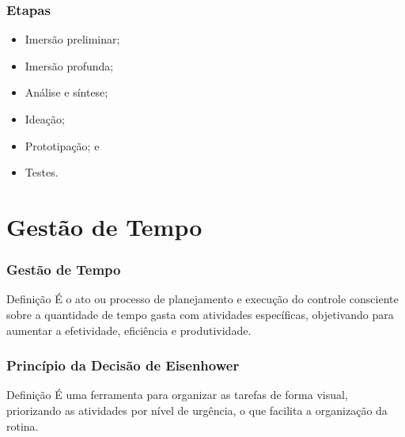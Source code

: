 \documentclass[aspectratio=169]{beamer}
\begin{document}
\begin{frame}
	\frametitle{Etapas}

	\begin{itemize}
		 \item Imersão preliminar;
		 \item Imersão profunda;
		 \item Análise e síntese;
		 \item Idea\c cão;
		 \item Prototipa\c cão; e
		 \item Testes.
	\end{itemize}
\end{frame}

\section{Gestão de Tempo}

\begin{frame}
	\frametitle{Gestão de Tempo}

	\begin{block}{Defini\c cão}
		 É o ato ou processo de planejamento e execução do controle consciente sobre a quantidade de tempo gasta com atividades específicas, objetivando para aumentar a efetividade, eficiência e produtividade.
	\end{block}
\end{frame}

\begin{frame}
	\frametitle{Princípio da Decisão de Eisenhower}

	\begin{block}{Defini\c cão}
		 É uma ferramenta para organizar as tarefas de forma visual, priorizando as atividades por nível de urgência, o que facilita a organização da rotina.
	\end{block}
\end{frame}
\end{document}
